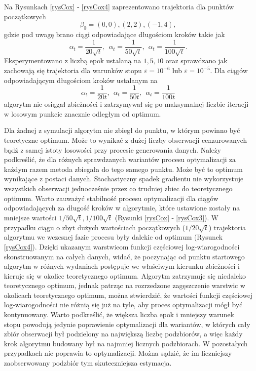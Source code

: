Na Rysunkach \ref{rysCox} - \ref{rysCox4} zaprezentowano trajektoria dla punktów początkowych
 $$\beta_0 = (0,0), (2,2), (-1,4),$$
 gdzie pod uwagę brano ciągi odpowiadające długościom kroków takie jak 
 $$\alpha_t=\frac{1}{20\sqrt{t}}, \ \ \alpha_t = \frac{1}{50\sqrt{t}}, \ \ \alpha_t = \frac{1}{100\sqrt{t}}.$$ 
 Eksperymentowano z liczbą epok ustalaną na $1,5,10$ oraz sprawdzano jak zachowają się trajektoria dla warunków stopu $\varepsilon=10^{-6}$ lub $\varepsilon=10^{-5}$. Dla ciągów odpowiadającym długościom kroków ustalanym na  
 $$\alpha_t=\frac{1}{20t}, \ \ \alpha_t = \frac{1}{50t}, \ \ \alpha_t = \frac{1}{100t}$$
   algorytm nie osiągał zbieżności i zatrzymywał się po maksymalnej liczbie iteracji w losowym punkcie znacznie odległym od optimum.

Dla żadnej z symulacji algorytm nie zbiegł do punktu, w którym powinno być teoretyczne optimum. Może to wynikać z dużej liczby obserwacji cenzurowanych bądź z samej istoty losowości przy procesie generowania danych. Należy podkreślić, że dla różnych sprawdzanych wariantów procesu optymalizacji za każdym razem metoda zbiegała do tego samego punktu. Może być to optimum wynikające z postaci danych. Stochastyczny spadek gradientu nie wykorzystuje wszystkich obserwacji jednocześnie przez co trudniej zbiec do teoretycznego optimum. Warto zauważyć stabilność procesu optymalizacji dla ciągów odpowiadających za długość kroków w algorytmie, które ustawione zostały na mniejsze wartości $1/50\sqrt{t}, 1/100\sqrt{t}$ (Rysunki \ref{rysCox} - \ref{rysCox3}). W przypadku ciągu o zbyt dużych wartościach początkowych ($1/20\sqrt{t}$) trajektoria algorytmu we wczesnej fazie procesu były dalekie od optimum (Rysunek \ref{rysCox4}). Dzięki ukazanym warstwicom funkcji częściowej log-wiarogodności skonstruowanym na całych danych, widać, że poczynając od punktu startowego algorytm w różnych wydaniach postępuje we właściwym kierunku zbieżności i kieruje się w okolice teoretycznego optimum. Algorytm zatrzymuje się niedaleko teoretycznego optimum, jednak patrząc na rozrzedzone zagęszczenie warstwic w okolicach teoretycznego optimum, można stwierdzić, że wartości funkcji częściowej log-wiarogodności nie różnią się już na tyle, aby proces optymalizacji mógł być kontynuowany. Warto podkreślić, że większa liczba epok i mniejszy warunek stopu powodują jedynie poprawienie optymalizacji dla wariantów, w których cały zbiór obserwacji był podzielony na największą liczbę podzbiorów, a więc każdy krok algorytmu budowany był na najmniej licznych podzbiorach. W pozostałych przypadkach nie poprawia to optymalizacji. Można sądzić, że im liczniejszy zaobserwowany podzbiór tym skuteczniejsza estymacja.


